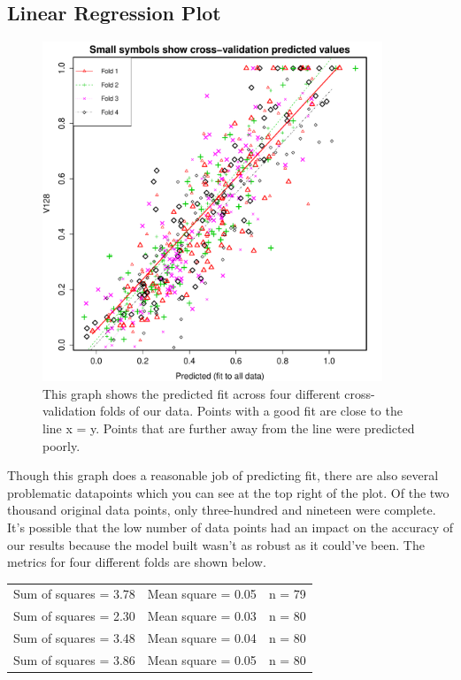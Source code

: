 \documentclass{article}
\begin{document}
\subsection{Linear Regression Plot}
\begin{figure}[H]
\centering
\includegraphics[width=4in]{part1a.pdf} \caption{This graph shows the
predicted fit across four different cross-validation folds of our data. Points
with a good fit are close to the line x = y. Points that are further away from
the line were predicted poorly.}
\end{figure}

Though this graph does a reasonable job of predicting fit, there are also
several problematic datapoints which you can see at the top right of the plot.
Of the two thousand original data points, only three-hundred and nineteen were
complete. It's possible that the low number of data points had an impact on the
accuracy of our results because the model built wasn't as robust as it could've
been. The metrics for four different folds are shown below.\\

\noindent
\begin{tabular}{l c r}
  Sum of squares = 3.78 & Mean square = 0.05 & n = 79\\ 
  Sum of squares = 2.30 & Mean square = 0.03 & n = 80\\
  Sum of squares = 3.48 & Mean square = 0.04 & n = 80\\ 
  Sum of squares = 3.86 & Mean square = 0.05 & n = 80\\ 
\end{tabular}\\
\end{document}
